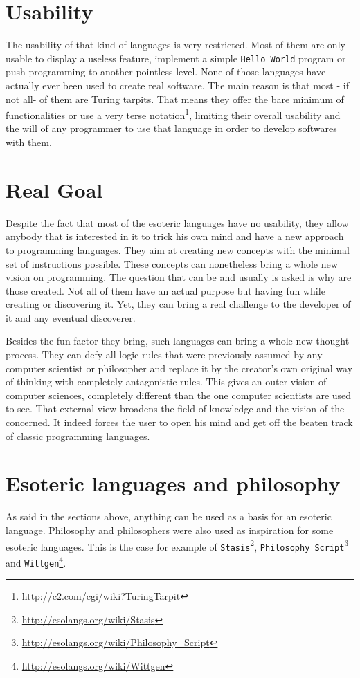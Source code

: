 \documentclass[4paper]{article}
\begin{document}
\section{Usability}
The usability of that kind of languages is very restricted. Most of them are only usable to display a useless feature, implement a simple \texttt{Hello World} program or push programming to another pointless level. None of those languages have actually ever been used to create real software. The main reason is that most - if not all- of them are Turing tarpits. That means they offer the bare minimum of functionalities or use a very terse notation\footnote{\url{http://c2.com/cgi/wiki?TuringTarpit}}, limiting their overall usability and the will of any programmer to use that language in order to develop softwares with them. 

\section{Real Goal}
Despite the fact that most of the esoteric languages have no usability, they allow anybody that is interested in it to trick his own mind and have a new approach to programming languages. They aim at creating new concepts with the minimal set of instructions possible. These concepts can nonetheless bring a whole new vision on programming. The question that can be and usually is asked is why are those created. Not all of them have an actual purpose but having fun while creating or discovering it. Yet, they can bring a real challenge to the developer of it and any eventual discoverer.

Besides the fun factor they bring, such languages can bring a whole new thought process. They can defy all logic rules that were previously assumed by any computer scientist or philosopher and replace it by the creator's own original way of thinking with completely antagonistic rules. This gives an outer vision of computer sciences, completely different than the one computer scientists are used to see. That external view broadens the field of knowledge and the vision of the concerned. It indeed forces the user to open his mind and get off the beaten track of classic programming languages.

\section{Esoteric languages and philosophy}
As said in the sections above, anything can be used as a basis for an esoteric language. Philosophy and philosophers were also used as inspiration for some esoteric languages. This is the case for example of \texttt{Stasis}\footnote{\url{http://esolangs.org/wiki/Stasis}}, \texttt{Philosophy Script}\footnote{\url{http://esolangs.org/wiki/Philosophy_Script}} and \texttt{Wittgen}\footnote{\url{http://esolangs.org/wiki/Wittgen}}. 
\end{document}
